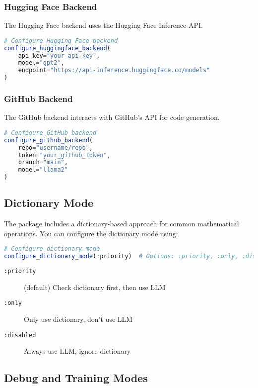 \documentclass[11pt,a4paper]{article}
\newcommand{\code}[1]{\texttt{#1}}
\providecommand{\code}[1]{\texttt{\color{blue!70!black}#1}}
\begin{document}
\subsubsection{Hugging Face Backend}
The Hugging Face backend uses the Hugging Face Inference API.

\begin{lstlisting}[language=Julia]
# Configure Hugging Face backend
configure_huggingface_backend(
    api_key="your_api_key",
    model="gpt2",
    endpoint="https://api-inference.huggingface.co/models"
)
\end{lstlisting}

\subsubsection{GitHub Backend}
The GitHub backend interacts with GitHub's API for code generation.

\begin{lstlisting}[language=Julia]
# Configure GitHub backend
configure_github_backend(
    repo="username/repo",
    token="your_github_token",
    branch="main",
    model="llama2"
)
\end{lstlisting}

\subsection{Dictionary Mode}
\label{subsec:dictionary_mode}

The package includes a dictionary-based approach for common mathematical operations. You can configure the dictionary mode using:

\begin{lstlisting}[language=Julia]
# Configure dictionary mode
configure_dictionary_mode(:priority)  # Options: :priority, :only, :disabled
\end{lstlisting}

\begin{description}
    \item[\code{:priority}] (default) Check dictionary first, then use LLM
    \item[\code{:only}] Only use dictionary, don't use LLM
    \item[\code{:disabled}] Always use LLM, ignore dictionary
\end{description}

\subsection{Debug and Training Modes}
\end{document}
